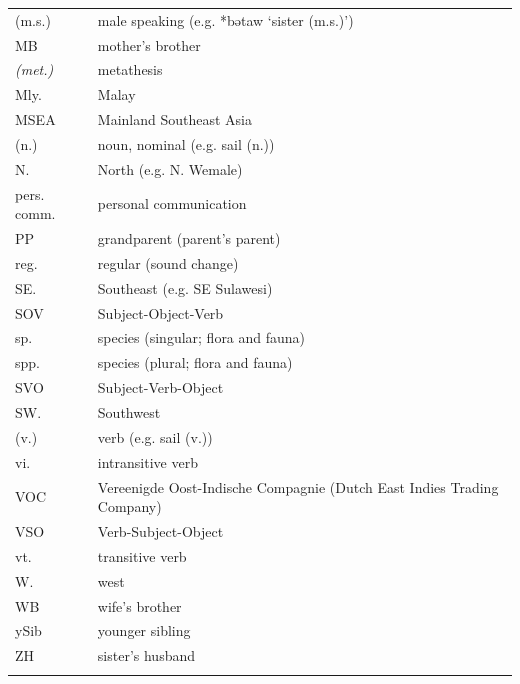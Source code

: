 {\begin{xltabular}{\textwidth}[l]{l>{\raggedright\arraybackslash}X}
(m.s.)	&	male speaking (e.g. *bətaw ‘sister (m.s.)’)	\\
MB	&	mother's brother	\\
\it{(met.)}	&	metathesis	\\
Mly.	&	Malay	\\
MSEA	&	Mainland Southeast Asia	\\
(n.)	&	noun, nominal (e.g. sail (n.))	\\
N.	&	North (e.g. N. Wemale)	\\
pers. comm.	&	personal communication	\\
PP	&	grandparent (parent's parent)	\\
reg.	&	regular (sound change)	\\
SE.	&	Southeast (e.g. SE Sulawesi)	\\
SOV	&	Subject-Object-Verb	\\
sp.	&	species (singular; flora and fauna)	\\
spp.	&	species (plural; flora and fauna)	\\
SVO	&	Subject-Verb-Object	\\
SW.	&	Southwest	\\
(v.)	&	verb (e.g.  sail (v.))	\\
vi.	&	intransitive verb	\\
VOC	&	Vereenigde Oost-Indische Compagnie (Dutch East Indies Trading Company)	\\
VSO	&	Verb-Subject-Object	\\
vt.	&	transitive verb	\\
W.	&	west	\\
WB	&	wife’s brother	\\
ySib	&	younger sibling	\\
ZH	&	sister’s husband	\\
\lspbottomrule
\end{xltabular}}



